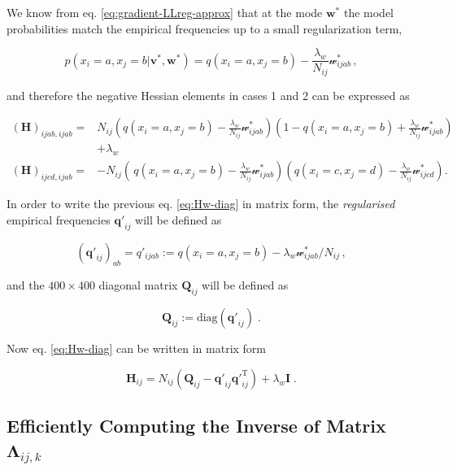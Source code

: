 \documentclass[12pt,a4paper,twoside]{book}
\newcommand{\eq}{\!=\!}
\renewcommand{\H}{\mathbf{H}}
\newcommand{\I}{\mathbf{I}}
\newcommand{\Lijk}{\mathbf{\Lambda}_{ij,k}}
\newcommand{\Qij}{\mathbf{Q}_{ij}}
\newcommand{\qij}{\mathbf{q\prime}_{ij}}
\renewcommand{\v}{\mathbf{v}}
\newcommand{\w}{\mathbf{w}}
\newcommand{\wijab}{\mathcal{w}_{ijab}}
\newcommand{\wijcd}{\mathcal{w}_{ijcd}}
\theoremstyle{definition}
\theoremstyle{definition}
\theoremstyle{remark}
\begin{document}
We know from eq. \eqref{eq:gradient-LLreg-approx} that at the mode
\(\w^*\) the model probabilities match the empirical frequencies up to a
small regularization term,

\begin{equation}
    p(x_i \eq a, x_j \eq b | \v^*,\w^*) = q(x_i \eq a, x_j \eq b) - \frac{\lambda_w}{N_{ij}}  \wijab^* \,,
\end{equation}

and therefore the negative Hessian elements in cases 1 and 2 can be
expressed as

\begin{align}
   (\H)_{ijab, ijab} =& N_{ij} \left( q(x_i \eq a, x_j \eq b)  - \frac{\lambda_w}{N_{ij}} \wijab^* \right) \left( 1 - q(x_i \eq a, x_j \eq b) +\frac{\lambda_w}{N_{ij}} \wijab^* \right) \\
   & + \lambda_w \\
   (\H)_{ijcd, ijab} =& -N_{ij} \left(\,q(x_i \eq a, x_j \eq b)  - \frac{\lambda_w}{N_{ij}} \wijab^* \right) \left( q(x_i \eq c, x_j \eq d) -\frac{\lambda_w}{N_{ij}} \wijcd^* \right) .
\label{eq:Hw-diag}
\end{align}

In order to write the previous eq. \eqref{eq:Hw-diag} in matrix form, the
\emph{regularised} empirical frequencies \(\qij\) will be defined as

\begin{equation}
    (\qij)_{ab} = q'_{ijab} := q(x_i \eq a, x_j \eq b) - \lambda_w  \wijab^* / N_{ij} \,,
\end{equation}

and the \(400 \times 400\) diagonal matrix \(\Qij\) will be defined as

\begin{equation}
    \Qij := \text{diag}(\qij) \; .
\end{equation}

Now eq. \eqref{eq:Hw-diag} can be written in matrix form

\begin{equation}
     \H_{ij} = N_{ij} \left( \Qij -  \qij \qij^{\mathrm{T}} \right)  + \lambda_w \I \; .
\label{eq:mat-Hij}
\end{equation}

\subsection{\texorpdfstring{Efficiently Computing the Inverse of Matrix
\(\Lijk\)}{Efficiently Computing the Inverse of Matrix \textbackslash{}Lijk}}\label{inv-lambda-ij-k}
\end{document}
